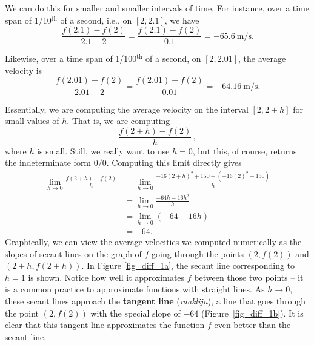 We can do this for smaller and smaller intervals of time. For instance, over a time span of 1/10$^\text{th}$ of a second, i.e., on $[2,2.1]$, we have 
$$
\frac{f(2.1)-f(2)}{2.1-2} = \frac{f(2.1)-f(2)}{0.1} =-65.6\ \text{m/s}.
$$

Likewise, over a time span of 1/100$^\text{th}$ of a second, on $[2,2.01]$, the average velocity is
$$\frac{f(2.01)-f(2)}{2.01-2} = \frac{f(2.01)-f(2)}{0.01} =-64.16\ \text{m/s}.$$

Essentially,  we are computing the average velocity on the interval $[2,2+h]$ for small values of $h$. That is, we are computing 
$$
\dfrac{f(2+h) - f(2)}{h}\,,
$$ 
where $h$ is small. Still, we really want to use $h=0$, but this, of course, returns  the indeterminate form  $0/0$. Computing this limit directly gives
		\begin{align*}\lim_{h\to 0} \frac{f(2+h)-f(2)}{h} &= \lim_{h\to 0}\frac{-16(2+h)^2+150 - (-16(2)^2+150)}{h} \\
																											&=	\lim_{h\to 0}\frac{-64h-16h^2}{h} \\
																											&= \lim_{h\to 0}(-64 -16h) \\
																											&=-64.
		\end{align*}
Graphically, we can view the average velocities we computed numerically as the slopes of secant lines on the graph of $f$ going through the points $(2,f(2))$ and $(2+h,f(2+h))$. In Figure \ref{fig_diff_1a}, the secant line corresponding to $h=1$ is shown. Notice how well it approximates $f$ between those two points -- it is a common practice to approximate functions with straight lines. 
As $h\to 0$, these secant lines approach the \textbf{tangent line} (\textit{raaklijn}), a line that goes through the point $(2,f(2))$ with the special slope of $-64$ (Figure~\ref{fig_diff_1b}). It is clear that this tangent line approximates the function $f$ even better than the secant line. 


